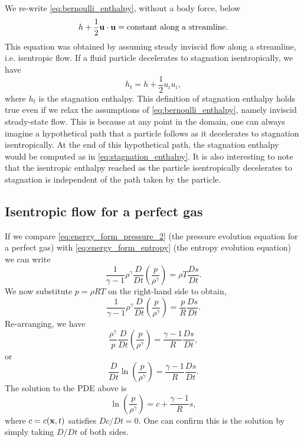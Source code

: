 \documentclass[oneside,a4paper,11pt]{report}
\begin{document}
We re-write \cref{eq:bernoulli_enthalpy}, without a body force, below 
\begin{equation}
    h + \frac{1}{2} \mathbf{u} \cdot \mathbf{u} = \text{constant along a streamline}.
\end{equation}
This equation was obtained by assuming steady inviscid flow along a streamline, i.e. isentropic flow. If a fluid particle decelerates to stagnation isentropically, we have
\begin{equation}
\label{eq:stagnation_enthalpy}
    h_t = h + \frac{1}{2} u_i u_i,
\end{equation}
where $h_t$ is the stagnation enthalpy. This definition of stagnation enthalpy holds true even if we relax the assumptions of \cref{eq:bernoulli_enthalpy}, namely inviscid steady-state flow. This is because at any point in the domain, one can always imagine a hypothetical path that a particle follows as it decelerates to stagnation isentropically. At the end of this hypothetical path, the stagnation enthalpy would be computed as in \cref{eq:stagnation_enthalpy}. It is also interesting to note that the isentropic enthalpy reached as the particle isentropically decelerates to stagnation is independent of the path taken by the particle.

\subsection{Isentropic flow for a perfect gas}
If we compare \cref{eq:energy_form_pressure_2} (the pressure evolution equation for a perfect gas) with \cref{eq:energy_form_entropy} (the entropy evolution equation) we can write
\begin{equation*}
        \frac{1}{\gamma - 1} \rho^\gamma \frac{D}{D t} \left ( \frac{p}{\rho^\gamma} \right ) = \rho T \frac{Ds}{Dt}.
\end{equation*}
We now substitute $p = \rho R T$ on the right-hand side to obtain,
\begin{equation*}
    \frac{1}{\gamma - 1} \rho^\gamma \frac{D}{D t} \left ( \frac{p}{\rho^\gamma} \right ) = \frac{p}{R} \frac{Ds}{Dt}.
\end{equation*}
Re-arranging, we have 
\begin{equation*}
    \frac{\rho^\gamma}{p} \frac{D}{D t} \left ( \frac{p}{\rho^\gamma} \right ) = \frac{\gamma - 1}{R} \frac{Ds}{Dt},
\end{equation*}
or 
\begin{equation*}
    \frac{D}{D t} \ln \left ( \frac{p}{\rho^\gamma} \right ) = \frac{\gamma - 1}{R} \frac{Ds}{Dt}.
\end{equation*}
The solution to the PDE above is
\begin{equation}
    \label{eq:p_rho_gamma_along_streamline}
    \ln \left ( \frac{p}{\rho^\gamma} \right ) = c + \frac{\gamma -1}{R} s,
\end{equation}
where $c=c(\mathbf{x},t)$ satisfies $Dc/Dt = 0$. One can confirm this is the solution by simply taking $D/Dt$ of both sides. 
\end{document}
